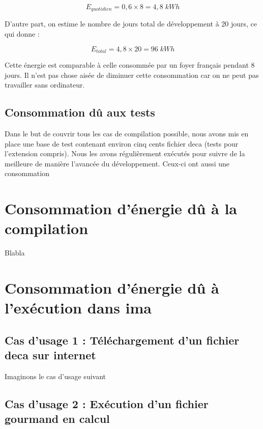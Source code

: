 \documentclass[12pt, a4paper, one side]{article}
\begin{document}
\begin{equation}
E_{quotidien}=0,6\times 8 = 4,8\; kWh
\end{equation}

D'autre part, on estime le nombre de jours total de développement à 20 jours, ce qui donne :

\begin{equation}
E_{total}=4,8\times 20 = 96\; kWh
\end{equation}


Cette énergie est comparable à celle consommée par un foyer français pendant 8 jours. Il n'est pas chose aisée de diminuer cette consommation car on ne peut pas travailler sans ordinateur.

\subsection{Consommation dû aux tests}

Dans le but de couvrir tous les cas de compilation possible, nous avons mis en place une base de test contenant environ cinq cents fichier deca (tests pour l’extension compris). Nous les avons régulièrement exécutés pour suivre de la meilleure de manière l'avancée du développement. Ceux-ci ont aussi une consommation

\section{Consommation d'énergie dû à la compilation}

Blabla

\section{Consommation d'énergie dû à l'exécution dans ima}

\subsection{Cas d'usage 1 : Téléchargement d'un fichier deca sur internet}

Imaginons le cas d'usage suivant

\subsection{Cas d'usage 2 : Exécution d'un fichier gourmand en calcul}
\end{document}
